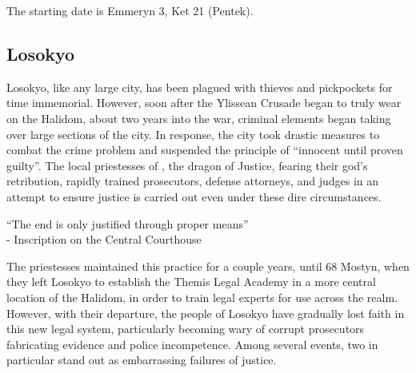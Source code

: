 \documentclass[11pt]{article} %
\newcommand{\linkto}[1]{\textbf{\nameref{#1}}}
\begin{document}
The starting date is Emmeryn 3, Ket 21 (Pentek).

\subsection{Losokyo}

Losokyo, like any large city, has been plagued with thieves and pickpockets for time immemorial. However, soon after the Ylissean Crusade began to truly wear on the Halidom, about two years into the war, criminal elements began taking over large sections of the city. In response, the city took drastic measures to combat the crime problem and suspended the principle of ``innocent until proven guilty''. The local priestesses of \linkto{religion:themis}, the dragon of Justice, fearing their god's retribution, rapidly trained prosecutors, defense attorneys, and judges in an attempt to ensure justice is carried out even under these dire circumstances.
\begin{center}
``The end is only justified through proper means'' \\
- Inscription on the Central Courthouse
\end{center}

The priestesses maintained this practice for a couple years, until 68 Mostyn, when they left Losokyo to establish the Themis Legal Academy in a more central location of the Halidom, in order to train legal experts for use across the realm. However, with their departure, the people of Losokyo have gradually lost faith in this new legal system, particularly becoming wary of corrupt prosecutors fabricating evidence and police incompetence. Among several events, two in particular stand out as embarrassing failures of justice.
\end{document}
